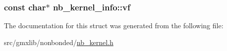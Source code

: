 \hypertarget{structnb__kernel__info_ac31392b2ec8304da3d2726fc75711bb6}{
\subsubsection[{vf}]{\setlength{\rightskip}{0pt plus 5cm}const char$\ast$ {\bf nb\-\_\-kernel\-\_\-info\-::vf}}}\label{structnb__kernel__info_ac31392b2ec8304da3d2726fc75711bb6}


\-The documentation for this struct was generated from the following file\-:\begin{DoxyCompactItemize}
\item 
src/gmxlib/nonbonded/\hyperlink{nb__kernel_8h}{nb\-\_\-kernel.\-h}\end{DoxyCompactItemize}
